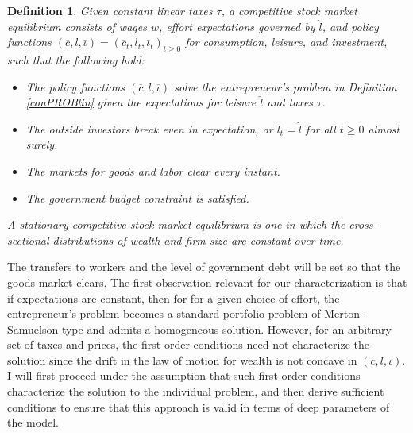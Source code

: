 \documentclass[11pt]{article}
\theoremstyle{plain}
\newtheorem{defn}{Definition}[section]
\begin{document}
\begin{defn} \label{SME}
Given constant linear taxes $\tau$, a competitive stock market equilibrium consists of wages $w$, effort expectations governed by $\hat{l}$, and policy functions $(\overline{c},l,\overline{\iota}) = (\overline{c}_t,l_t,\overline{\iota}_t)_{t\geq0}$ for consumption, leisure, and investment, such that the following hold:
\begin{itemize}
\item The policy functions $(\overline{c},l,\overline{\iota})$ solve the entrepreneur's problem in Definition \ref{conPROBlin} given the expectations for leisure $\hat{l}$ and taxes $\tau$. 
\item The outside investors break even in expectation, or $l_t = \hat{l}$ for all $t\geq0$ almost surely. 
\item The markets for goods and labor clear every instant. 
\item The government budget constraint is satisfied. 
\end{itemize}
A stationary competitive stock market equilibrium is one in which the cross-sectional distributions of wealth and firm size are constant over time. 
\end{defn} 
The transfers to workers and the level of government debt will be set so that the goods market clears. The first observation relevant for our characterization is that if expectations are constant, then for for a given choice of effort, the entrepreneur's problem becomes a standard portfolio problem of Merton-Samuelson type and admits a homogeneous solution. However, for an arbitrary set of taxes and prices, the first-order conditions need not characterize the solution since the drift in the law of motion for wealth is not concave in $(c, l, \overline{\iota})$. I will first proceed under the assumption that such first-order conditions characterize the solution to the individual problem, and then derive sufficient conditions to ensure that this approach is valid in terms of deep parameters of the model. 

\end{document}
